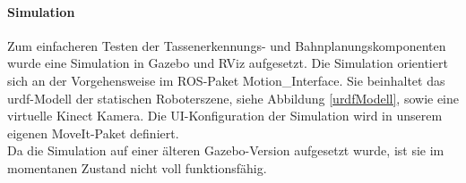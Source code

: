 \paragraph{Simulation}
Zum einfacheren Testen der Tassenerkennungs- und Bahnplanungskomponenten wurde eine Simulation in Gazebo und RViz aufgesetzt. Die Simulation orientiert sich an der Vorgehensweise im ROS-Paket \glqq Motion\_Interface\grqq. Sie beinhaltet das urdf-Modell der statischen Roboterszene, siehe Abbildung \ref{urdfModell}, sowie eine virtuelle Kinect Kamera. Die UI-Konfiguration der Simulation wird in unserem eigenen MoveIt-Paket definiert.
\newline \\
Da die Simulation auf einer älteren Gazebo-Version aufgesetzt wurde, ist sie im momentanen Zustand nicht voll funktionsfähig.
